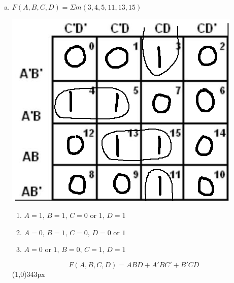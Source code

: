 \documentclass[11pt]{article}
\begin{document}
\begin{enumerate}[a)]
    \item
    $F(A,B,C,D) = \Sigma m(3,4,5,11,13,15)$
    \vspace{-15pt}\begin{center}
        \includegraphics[scale=0.35]{2c.png}
    \end{center}
    \vspace{-20pt}\begin{enumerate}[$\bullet$]
        \item $A = 1,\, B = 1,\, C = 0$ or $1,\, D = 1$
        \item \vspace{-5pt}$A=0,\, B=1,\, C=0,\, D=0$ or $1$
        \item \vspace{-5pt}$A = 0$ or $1,\, B = 0,\, C = 1,\, D = 1$
    \end{enumerate}
    $$F(A,B,C,D) = ABD + A'BC' + B'CD$$
    \line(1,0){343px}


\end{enumerate}
\end{document}

